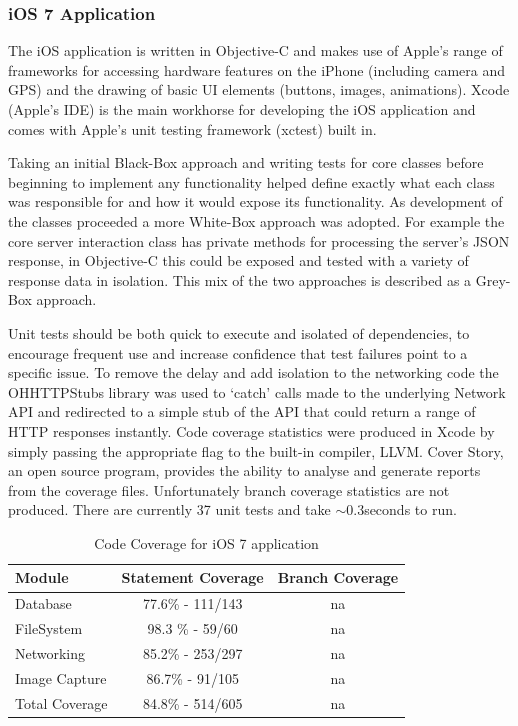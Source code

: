 \documentclass[a4paper,11pt]{article}
\begin{document}
\subsubsection{iOS 7 Application}

The iOS application is written in Objective-C and makes use of Apple's range of frameworks for accessing hardware features on the iPhone (including camera and GPS) and the drawing of basic UI elements (buttons, images, animations). Xcode (Apple's IDE) is the main workhorse for developing the iOS application and comes with Apple's unit testing framework (xctest) built in.

Taking an initial Black-Box approach and writing tests for core classes before beginning to implement any functionality helped define exactly what each class was responsible for and how it would expose its functionality. As development of the classes proceeded a more White-Box approach was adopted. For example the core server interaction class has private methods for processing the server's JSON response, in Objective-C this could be exposed and tested with a variety of response data in isolation. This mix of the two approaches is described as a Grey-Box approach.

Unit tests should be both quick to execute and isolated of dependencies, to encourage frequent use and increase confidence that test failures point to a specific issue. To remove the delay and add isolation to the networking code the OHHTTPStubs library was used to `catch' calls made to the underlying Network API and redirected to a simple stub of the API that could return a range of HTTP responses instantly. Code coverage statistics were produced in Xcode by simply passing the appropriate flag to the built-in compiler, LLVM. Cover Story, an open source program, provides the ability to analyse and generate reports from the coverage files. Unfortunately branch coverage statistics are not produced. There are currently 37 unit tests and take $\sim0.3$seconds to run.

\begin{table}[h]
   \centering
    \begin{tabular}{|l|cc|}
    \hline
    Module & Statement Coverage & Branch Coverage \\ \hline
    Database & 77.6\% - 111/143 & na     \\
    FileSystem & 98.3 \% - 59/60 & na \\
    Networking & 85.2\% - 253/297 & na \\
    Image Capture & 86.7\% - 91/105 & na\\
    \hline
    Total Coverage & 84.8\% - 514/605 &  na \\      
    \hline
    \end{tabular}
    \caption {Code Coverage for iOS 7 application}
\end{table}
\end{document}

